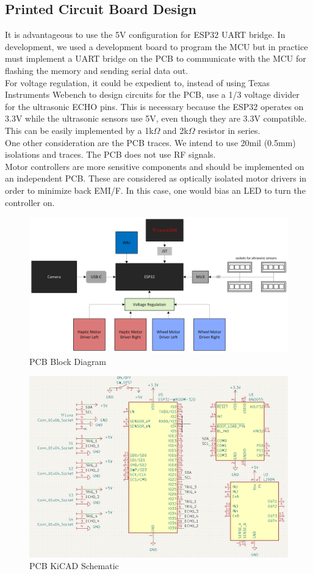 \subsection{Printed Circuit Board Design} \label{sec:pcb-design}
\noindent It is advantageous to use the 5V configuration for ESP32 UART bridge. In development, we used a development board to program the MCU but in practice must implement a UART bridge on the PCB to communicate with the MCU for flashing the memory and sending serial data out.\\

\noindent For voltage regulation, it could be expedient to, instead of using Texas Instruments Webench to design circuits for the PCB, use a 1/3 voltage divider for the ultrasonic ECHO pins. This is necessary because the ESP32 operates on 3.3V while the ultrasonic sensors use 5V, even though they are 3.3V compatible. This can be easily implemented by a 1k$\Omega$ and 2k$\Omega$ resistor in series.\\

\noindent One other consideration are the PCB traces. We intend to use 20mil (0.5mm) isolations and traces. The PCB does not use RF signals.\\

\noindent Motor controllers are more sensitive components and should be implemented on an independent PCB. These are considered as optically isolated motor drivers in order to minimize back EMI/F. In this case, one would bias an LED to turn the controller on.\\

\begin{figure}[H]
	\centering
	\includegraphics[width=\textwidth]{./Images/PCB-Block-Diagram.png}
	\caption{\label{fig:pcb}PCB Block Diagram}
\end{figure}

\begin{figure}[H]
	\centering
	\includegraphics[width=\textwidth]{./Images/PCB-sch.png}
	\caption{\label{fig:pcb-sch}PCB KiCAD Schematic}
\end{figure}
